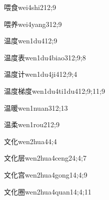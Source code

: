 \begin{verbete}{喂食}{wei4shi2}{12;9}
\end{verbete}

\begin{verbete}{喂养}{wei4yang3}{12;9}
\end{verbete}

\begin{verbete}{温度}{wen1du4}{12;9}
\end{verbete}

\begin{verbete}{温度表}{wen1du4biao3}{12;9;8}
\end{verbete}

\begin{verbete}{温度计}{wen1du4ji4}{12;9;4}
\end{verbete}

\begin{verbete}{温度梯度}{wen1du4ti1du4}{12;9;11;9}
\end{verbete}

\begin{verbete}{温暖}{wen1nuan3}{12;13}
\end{verbete}

\begin{verbete}{温柔}{wen1rou2}{12;9}
\end{verbete}

\begin{verbete}{文化}{wen2hua4}{4;4}
\end{verbete}

\begin{verbete}{文化层}{wen2hua4ceng2}{4;4;7}
\end{verbete}

\begin{verbete}{文化宫}{wen2hua4gong1}{4;4;9}
\end{verbete}

\begin{verbete}{文化圈}{wen2hua4quan1}{4;4;11}
\end{verbete}


